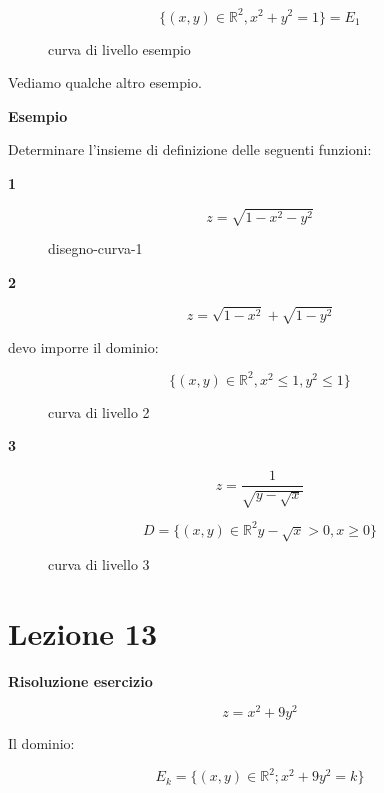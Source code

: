 \documentclass[11pt]{article}
\begin{document}
\[
    \{(x,y) \in \mathbb{R}^{2},x^{2}+y^{2}=1\} = E_1
\]


\begin{figure}[ht]
    \centering
    \caption{curva di livello esempio}
    \label{fig:curva-di-livello-esempio}
\end{figure}

Vediamo qualche altro esempio.

\textbf{Esempio} 

Determinare l'insieme di definizione delle seguenti funzioni:

\textbf{1} 

\[
    z=\sqrt{1-x^{2}-y^{2}}
\]


\begin{figure}[ht]
    \centering
    \caption{disegno-curva-1}
    \label{fig:disegno-curva-1}
\end{figure}

\textbf{2} 

\[
    z=\sqrt{1-x^{2}}+\sqrt{1-y^{2}}
\]

devo imporre il dominio:

\[
    \{(x,y) \in \mathbb{R}^{2},x^{2}\le 1,y^{2}\le 1\}
\]


\begin{figure}[ht]
    \centering
    \caption{curva di livello 2}
    \label{fig:curva-di-livello-2}
\end{figure}


\textbf{3} 

\[
    z= \frac{1}{\sqrt{y-\sqrt{x}}}
\]

\[
    D=\{(x,y) \in \mathbb{R}^{2} y-\sqrt{x}>0,x \ge 0\}
\]


\begin{figure}[ht]
    \centering
    \caption{curva di livello 3}
    \label{fig:curva-di-livello-3}
\end{figure}

\section{Lezione 13}

\textbf{Risoluzione esercizio}

\[
    z = x^{2}+9y^{2}
\]

Il dominio:

\[
    E_k= \{(x,y) \in \mathbb{R}^{2};x^{2}+9y^{2}=k\}
\]
\end{document}

